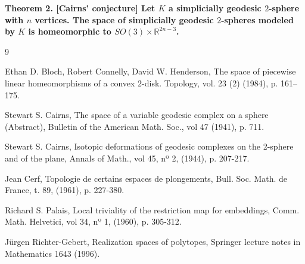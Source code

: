 \documentclass[12pt]{article}
\begin{document}
\textbf{Theorem 2. [Cairns' conjecture]
Let $K$ a simplicially geodesic $2$-sphere with $n$ vertices. The space of simplicially geodesic $2$-spheres modeled by $K$ is homeomorphic to $SO(3) \times \mathbb{R}^{2n-3}$.}



\renewcommand{\refname}{Bibliography}

\begin{thebibliography}{9}

 Ethan D. Bloch, Robert Connelly, David W. Henderson, The space of piecewise linear homeomorphisms of a convex 2-disk. Topology, vol. 23 (2) (1984), p. 161–175.

 Stewart S. Cairns, The space of a variable geodesic complex on a sphere (Abstract), Bulletin of the American Math. Soc., vol 47 (1941), p. 711.

 Stewart S. Cairns, Isotopic deformations of geodesic complexes on the 2-sphere and of the plane, Annals of Math., vol 45, nº 2, (1944), p. 207-217.

 Jean Cerf, Topologie de certains espaces de plongements, Bull. Soc. Math. de France, t. 89, (1961), p. 227-380.

 Richard S. Palais, Local triviality of the restriction map for embeddings, Comm. Math. Helvetici, vol 34, nº 1, (1960), p. 305-312.

 Jürgen Richter-Gebert, Realization spaces of polytopes, Springer lecture notes in Mathematics 1643 (1996).

\end{thebibliography}
\end{document}
